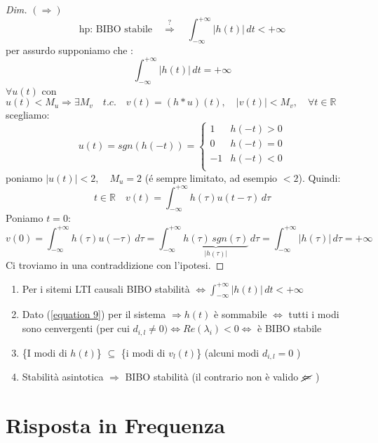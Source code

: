 \begin{proof}[Dim]
	\emph{$(\Rightarrow)$}
	\[
		\text{hp: BIBO stabile} \quad \overset{?}{\Rightarrow} \quad \int_{-\infty}^{+\infty}\lvert h(t) \rvert \,dt < +\infty
	\]
	per assurdo supponiamo che :
	\[
		\int_{-\infty}^{+\infty}\lvert h(t) \rvert \,dt = +\infty
	\]
	$\forall u(t)$ con $u(t)<M_u \Rightarrow \exists M_v \quad t.c. \quad v(t) = (h*u)(t), \quad \lvert v(t) \rvert < M_v , \quad \forall t \in \mathbb{R} \quad$scegliamo:
	\[
		u(t) = sgn(h(-t)) = \begin{cases}
			1 &h(-t)>0\\
			0 &h(-t)=0\\
			-1 &h(-t)<0\\
		\end{cases}
	\]
	poniamo $\lvert u(t)\rvert <2,\quad M_u = 2$ (é sempre limitato, ad esempio $<2$). %
	Quindi:
	\[
		t \in \mathbb{R}\quad v(t) = \int_{-\infty}^{+\infty}h(\tau)u(t-\tau)\,d\tau 
	\]
	Poniamo $t=0$:
	\[
		v(0) = \int_{-\infty}^{+\infty}h(\tau)u(-\tau)\,d\tau 
		= \int_{-\infty}^{+\infty}\underbrace{h(\tau)\, sgn(\tau)}_{\lvert h(\tau)\rvert}\,d\tau %
		= \int_{-\infty}^{+\infty}\lvert h(\tau) \rvert \,d\tau = +\infty
	\]
	Ci troviamo in una contraddizione con l'ipotesi.
\end{proof}

\begin{osservazione}\leavevmode
	\begin{enumerate}
		\item Per i sitemi LTI causali BIBO stabilità $\Leftrightarrow \int_{-\infty}^{+\infty}\lvert h(t) \rvert \,dt < +\infty$
		\item Dato (\ref{equation 9}) per il sistema %
		$\Rightarrow h(t) $ è sommabile $\Leftrightarrow$ tutti i modi sono cenvergenti (per cui $d_{i,l}\ne0)\Leftrightarrow Re(\lambda_i)<0 \Leftrightarrow $ è BIBO stabile
		\item \{I modi di $h(t)$\} $\subseteq$ \{i modi di $v_l(t)$\} (alcuni modi $d_{i,l}=0$ )
		\item  Stabilità asintotica $\Rightarrow$ BIBO stabilità (il contrario non è valido $\cancel{\Leftarrow}$ )
	\end{enumerate}
\end{osservazione}


\section{Risposta in Frequenza}

